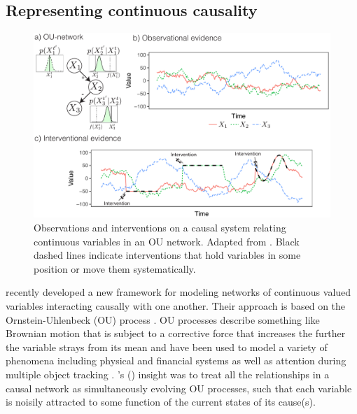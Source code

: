 \documentclass{cambridge7A}%
\newcommand{\ntodo}[2][]{\vspace{0.1cm} \hfil \todo[caption={\textbf{NB}}, size=\footnotesize, color = aliceblue, inline, #1]{#2}}
\newcommand{\ttodo}[2][]{\vspace{0.1cm} \hfil \todo[caption={\textbf{TG}}, size=\footnotesize, color = orange, inline, #1]{#2}}
\def\citeapos#1{\citeauthor{#1}'s (\citeyear{#1})}
\begin{document}
\subsection{Representing continuous causality}

\begin{figure}[t]
   \centering
   \includegraphics[width = \columnwidth]{OU}
   \caption{Observations and interventions on a causal system relating continuous variables in an OU network.  Adapted from \cite{davis2018ctcv}.    Black dashed lines indicate interventions that hold variables in some position or move them systematically.}
   \label{fig:OU}
\end{figure}

\cite{davis2018ctcv} recently developed a new framework for modeling networks of continuous valued variables interacting causally with one another.  Their approach is based on the Ornstein-Uhlenbeck (OU) process \citep{uhlenbeck1930theory}.  %
OU processes describe something like Brownian motion that is subject to a corrective force that increases the further the variable strays from its mean and  %
have been used to model a variety of phenomena including physical \citep{lacko2012planning} and financial \citep{barndorff2001non} systems as well as attention during multiple object tracking \citep{vul2009explaining}.  \citeapos{davis2018ctcv} insight was to treat all the relationships in a causal network as simultaneously evolving OU processes, such that each variable is noisily attracted to some function of the current states of its cause(s).  %
\end{document}
